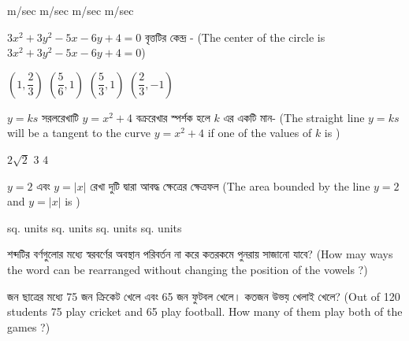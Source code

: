 \documentclass[addpoints]{exam}
\begin{document}
\begin{questions}
\begin{oneparchoices}
 m/sec
 m/sec
 m/sec
 m/sec

\end{oneparchoices}

\question  $ 3x^{2} + 3y^{2} -5x-6y +4 =0 $ বৃত্তটির কেন্দ্র - (The center of the circle is  $ 3x^{2} + 3y^{2} -5x-6y +4 =0 $) 

\begin{oneparchoices}
\choice $ (1, \dfrac{2}{3})$
\choice $ (\dfrac{5}{6}, 1) $
\choice $ (\dfrac{5}{3}, 1) $
\choice $ (\dfrac{2}{3}, -1) $

\end{oneparchoices}

\question  $ y=ks $ সরলরেখাটি $ y = x^{2}+4 $ বক্ররেখার স্পর্শক হলে $ k $ এর একটি মান- (The straight line $ y=ks $ will be a tangent to the curve $ y = x^{2}+4 $ if one of the values of $ k $ is ) 

\begin{oneparchoices}
\choice $ 2\sqrt{2} $
\choice $ 3 $
\choice $ 4 $

\end{oneparchoices}

\question  $ y=2 $ এবং $ y=|x| $ রেখা দুটি দ্বারা আবদ্ধ ক্ষেত্রের ক্ষেত্রফল (The area bounded by the line $ y=2 $ and $ y=|x| $ is )

\begin{oneparchoices}
 sq. units
 sq. units
 sq. units
 sq. units

\end{oneparchoices}

\question  {}  শব্দটির বর্ণগুলোর মধ্যে স্বরবর্ণের অবস্থান পরিবর্তন না করে কতরকমে পুনরায় সাজানো যাবে? (How may ways the word  can be rearranged without changing the position of the vowels ?)

\begin{oneparchoices}
\end{oneparchoices}


 জন ছাত্রের মধ্যে 75 জন ক্রিকেট খেলে এবং 65 জন ফুটবল খেলে। কতজন উভয় খেলাই খেলে? (Out of 120 students 75 play cricket and 65 play football. How many of them play both of the games ?)

\begin{oneparchoices}

\end{oneparchoices}


\end{questions}
\end{document}
